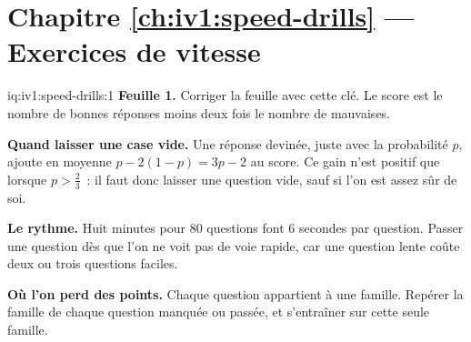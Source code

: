 \section*{Chapitre \ref{ch:iv1:speed-drills} --- Exercices de vitesse}

\begin{solution}{iq:iv1:speed-drills:1}
\textbf{Feuille 1.} Corriger la feuille avec cette clé. Le score est le nombre de bonnes réponses moins deux fois le nombre de mauvaises.
\par\nopagebreak


\textbf{Quand laisser une case vide.} Une réponse devinée, juste avec la probabilité $p$, ajoute en moyenne $p - 2(1 - p) = 3p - 2$ au score. Ce gain n'est positif que lorsque $p > \tfrac23$~: il faut donc laisser une question vide, sauf si l'on est assez sûr de soi.

\textbf{Le rythme.} Huit minutes pour 80 questions font 6 secondes par question. Passer une question dès que l'on ne voit pas de voie rapide, car une question lente coûte deux ou trois questions faciles.

\textbf{Où l'on perd des points.} Chaque question appartient à une famille. Repérer la famille de chaque question manquée ou passée, et s'entraîner sur cette seule famille.


\end{solution}

